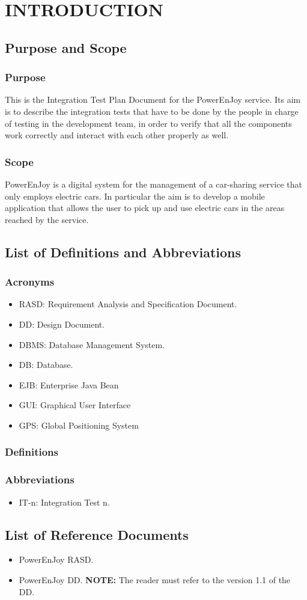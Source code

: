 \section{INTRODUCTION}
\subsection{Purpose and Scope}
\subsubsection{Purpose}

This is the Integration Test Plan Document for the PowerEnJoy service. Its aim is to describe the integration tests that have to be done by the people in charge of testing in the development team, in order to verify that all the components work correctly and interact with each other properly as well.
 
\subsubsection{Scope}
PowerEnJoy is a digital system for the management of a car-sharing service that only employs electric cars. In particular the aim is to develop a mobile application that allows the user to pick up and use electric cars in the areas reached by the service.
\subsection{List of Definitions and Abbreviations} 
\subsubsection{Acronyms}
\begin{itemize}
\item RASD: Requirement Analysis and Specification Document.
\item DD: Design Document.
\item DBMS: Database Management System.
\item DB: Database.
\item EJB: Enterprise Java Bean
\item GUI: Graphical User Interface
\item GPS: Global Positioning System

\end{itemize}
\subsubsection{Definitions}

\subsubsection{Abbreviations}
\begin{itemize}
\item IT-n: Integration Test n.
\end{itemize}



\subsection{List of Reference Documents}
\begin{itemize}
	\item PowerEnJoy RASD.	
	\item PowerEnJoy DD.
	\textbf{NOTE:} The reader must refer to the version 1.1 of the DD.
\end{itemize}

